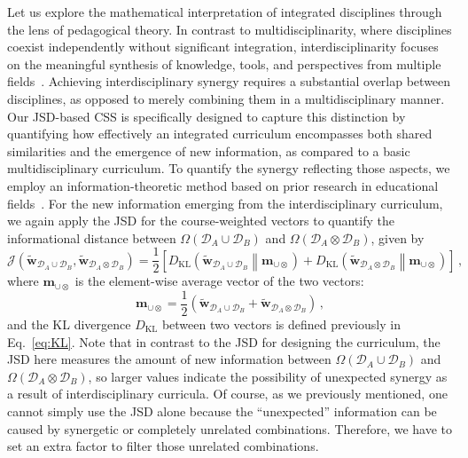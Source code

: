 \documentclass{bmcart}
\begin{document}
Let us explore the mathematical interpretation of integrated disciplines through the lens of pedagogical theory. In contrast to multidisciplinarity, where disciplines coexist independently without significant integration, interdisciplinarity focuses on the meaningful synthesis of knowledge, tools, and perspectives from multiple fields~\cite{Wagner2011, Jacob2015}. Achieving interdisciplinary synergy requires a substantial overlap between disciplines, as opposed to merely combining them in a multidisciplinary manner. Our JSD-based CSS is specifically designed to capture this distinction by quantifying how effectively an integrated curriculum encompasses both shared similarities and the emergence of new information, as compared to a basic multidisciplinary curriculum. To quantify the synergy reflecting those aspects, we employ an information-theoretic method based on prior research in educational fields~\cite{Klein2006, Ashby2019, Didham_Fujii_Torkar_2024, Choi2006, Jacobs2013, Stember1991}. For the new information emerging from the interdisciplinary curriculum, we again apply the JSD for the course-weighted vectors to quantify the informational distance between \( \Omega \left( \mathcal{D}_A \cup \mathcal{D}_B \right) \) and \( \Omega \left( \mathcal{D}_A \otimes \mathcal{D}_B \right) \), given by 
\begin{equation}
\mathcal{J}\left(\tilde{\mathbf{w}}_{\mathcal{D}_A \cup \mathcal{D}_B},\tilde{\mathbf{w}}_{\mathcal{D}_A \otimes \mathcal{D}_B} \right) = \frac{1}{2} \left[ D_\text{KL}\left(\tilde{\mathbf{w}}_{\mathcal{D}_A \cup \mathcal{D}_B} \middle\| \mathbf{m}_{\cup\otimes} \right) 
    + D_\text{KL}\left(\tilde{\mathbf{w}}_{\mathcal{D}_A \otimes \mathcal{D}_B} \middle\| \mathbf{m}_{\cup\otimes} \right) \right] \,,
\label{eq:finalJSD}
\end{equation}
where \( \mathbf{m}_{\cup\otimes} \) is the element-wise average vector of the two vectors:
\begin{equation}
    \mathbf{m}_{\cup\otimes} = \frac{1}{2} \left( \tilde{\mathbf{w}}_{\mathcal{D}_A \cup \mathcal{D}_B} + \tilde{\mathbf{w}}_{\mathcal{D}_A \otimes \mathcal{D}_B} \right) \,,
\end{equation}
and the KL divergence \( D_\text{KL} \) between two vectors is defined previously in Eq.~\eqref{eq:KL}. Note that in contrast to the JSD for designing the curriculum, the JSD here measures the amount of new information between \( \Omega \left( \mathcal{D}_A \cup \mathcal{D}_B \right) \) and \( \Omega \left( \mathcal{D}_A \otimes \mathcal{D}_B \right) \), so larger values indicate the possibility of unexpected synergy as a result of interdisciplinary curricula. Of course, as we previously mentioned, one cannot simply use the JSD alone because the ``unexpected'' information can be caused by synergetic or completely unrelated combinations. Therefore, we have to set an extra factor to filter those unrelated combinations. 
\end{document}
